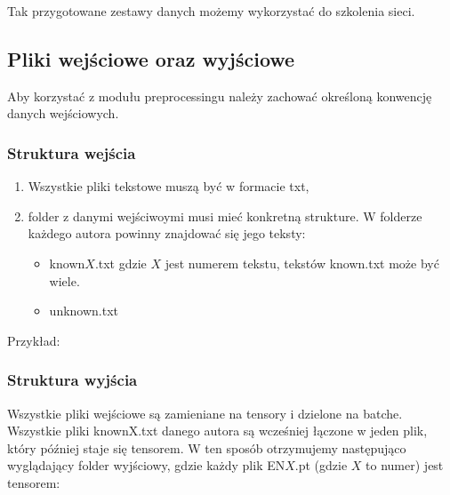 
Tak przygotowane zestawy danych możemy wykorzystać do szkolenia sieci.


\newpage
\subsection{Pliki wejściowe oraz wyjściowe}
Aby korzystać z modułu preprocessingu należy zachować określoną konwencję danych wejściowych. 

\subsubsection{Struktura wejścia}

\begin{enumerate}
	\item Wszystkie pliki tekstowe muszą być w formacie txt,
	\item folder z danymi wejściwoymi musi mieć konkretną strukture. W folderze każdego autora
		  powinny znajdować się jego teksty: 
			\begin{itemize}
				\item known$X$.txt gdzie $X$ jest numerem tekstu, tekstów known.txt może być wiele.
				\item unknown.txt
			\end{itemize}
\end{enumerate}

Przykład: 

\myspace
{}
\myspace

\newpage
\subsubsection{Struktura wyjścia}

Wszystkie pliki wejściowe są zamieniane na tensory i dzielone na batche. Wszystkie pliki knownX.txt 
danego autora są wcześniej łączone w jeden plik, który później staje się tensorem. W ten sposób 
otrzymujemy następująco wyglądający folder wyjściowy, gdzie każdy plik EN$X$.pt (gdzie $X$ to numer)
 jest tensorem:

\myspace
{}
\myspace
